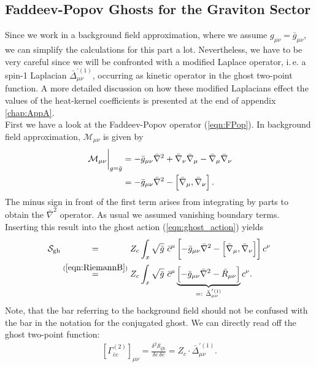\subsection{Faddeev-Popov Ghosts for the Graviton Sector}
Since we work in a background field approximation, where we assume $g_{\mu\nu}=\bar{g}_{\mu\nu}$, we can simplify the calculations for this part a lot. Nevertheless, we have to be very careful since we will be confronted with a modified Laplace operator, i.\,e. a spin-1 Laplacian $\bar{\Delta}_{\mu\nu}^{'(1)}$, occurring as kinetic operator in the ghost two-point function. A more detailed discussion on how these modified Laplacians effect the values of the heat-kernel coefficients is presented at the end of appendix \ref{chap:AppA}. \\
First we have a look at the Faddeev-Popov operator (\ref{eqn:FPop}). In background field approximation, $\mathcal{M}_{\mu\nu}$ is given by 
\begin{equation}
\begin{aligned}
	\eval{\mathcal{M}_{\mu\nu}}_{g=\bar{g}} &= -\bar{g}_{\mu\nu}\bar{\nabla}^2 + \bar{\nabla}_{\nu}\bar{\nabla}_{\mu} - \bar{\nabla}_{\mu}\bar{\nabla}_{\nu} \\
	&= -\bar{g}_{\mu\nu}\bar{\nabla}^2 - \left[\bar{\nabla}_{\mu}, \bar{\nabla}_{\nu}\right].
\end{aligned}
\end{equation} 
The minus sign in front of the first term arises from integrating by parts to obtain the $\bar{\nabla}^2$ operator. As usual we assumed vanishing boundary terms. Inserting this result into the ghost action (\ref{eqn:ghost_action}) yields
\begin{equation}
	\begin{aligned}
		\mathcal{S}_{\mathrm{gh}} &\overset{\phantom{(\mathrm{\ref{eqn:RiemannB}})}}{=} Z_c\int_x \sqrt{\bar{g}} \ \bar{c}^{\mu}\left[-\bar{g}_{\mu\nu}\bar{\nabla}^2 - \left[\bar{\nabla}_{\mu}, \bar{\nabla}_{\nu}\right]\right]  c^{\nu} \\
		&\overset{(\mathrm{\ref{eqn:RiemannB}})}{=}  Z_c\int_x \sqrt{\bar{g}} \ \bar{c}^{\mu}\underbrace{\left[-\bar{g}_{\mu\nu}\bar{\nabla}^2 - \bar{R}_{\mu\nu}\right]}_{=: \ \bar{\Delta}_{\mu\nu}^{'(1)}} c^{\nu}.
	\end{aligned}
\end{equation}
Note, that the bar referring to the background field should not be confused with the bar in the notation for the conjugated ghost.
We can directly read off the ghost two-point function:
\begin{align}
	\left[\Gamma^{(2)}_{\bar{c}c}\right]_{\mu\nu} = \frac{\delta^2 \mathcal{S}_{\mathrm{gh}}}{\delta c\ \delta\bar{c}} = Z_c \cdot\bar{\Delta}_{\mu\nu}^{'(1)}.
\end{align}
